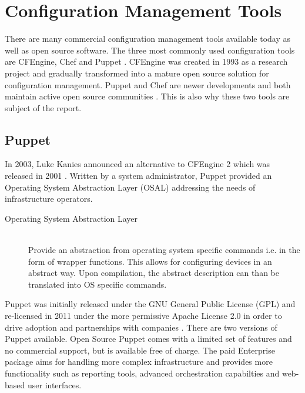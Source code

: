 \section{Configuration Management Tools}



There are many commercial configuration management tools available today as well as open source software. The three most commonly used configuration tools are CFEngine, Chef and Puppet \cite{pandey2012investigating}. CFEngine was created in 1993 as a research project and gradually transformed into a mature open source solution for configuration management\cite{Zamboni:2012:LCA:2341102}. Puppet and Chef are newer developments and both maintain active open source communities \cite{pandey2012investigating}. This is also why these two tools are subject of the report.


\subsection{Puppet}

In 2003, Luke Kanies announced an alternative to CFEngine 2 which was released in 2001 \cite{pandey2012investigating}. Written by a system administrator, Puppet provided an Operating System Abstraction Layer (OSAL) \cite{kanies2006puppet} addressing the needs of infrastructure operators.

\begin{description}
	\item [Operating System Abstraction Layer] \hfill \\
	Provide an abstraction from operating system specific commands i.e. in the form of wrapper functions. This allows for configuring devices in an abstract way. Upon compilation, the abstract description can than be translated into OS specific commands.
\end{description}

Puppet was initially released under the GNU General Public License (GPL) and re-licensed in 2011 under the more permissive Apache License 2.0 in order to drive adoption and partnerships with companies \cite{puppetcomapache}. There are two versions of Puppet available. Open Source Puppet comes with a limited set of features and no commercial support, but is available free of charge. The paid Enterprise package aims for handling more complex infrastructure and provides more functionality such as reporting tools, advanced orchestration capabilties and web-based user interfaces\cite{puppetcomenterprise}.



